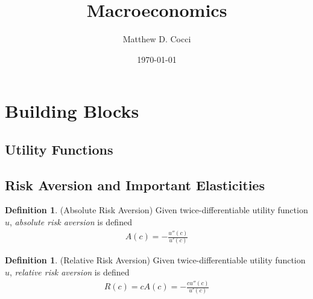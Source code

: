 \documentclass[12pt]{article}
\author{Matthew D. Cocci}
\title{Macroeconomics}
\date{\today}
\theoremstyle{plain}
\theoremstyle{definition}
\newtheorem{defn}[thm]{Definition}
\theoremstyle{remark}
\begin{document}
\maketitle

\tableofcontents

\clearpage

\section{Building Blocks}

\subsection{Utility Functions}


\subsection{Risk Aversion and Important Elasticities}

\begin{defn}(Absolute Risk Aversion)
Given twice-differentiable utility function $u$,
\emph{absolute risk aversion} is defined
\begin{align*}
  A(c) = -\frac{u''(c)}{u'(c)}
\end{align*}
\end{defn}

\begin{defn}(Relative Risk Aversion)
Given twice-differentiable utility function $u$,
\emph{relative risk aversion} is defined
\begin{align*}
  R(c) = cA(c) = -\frac{c u''(c)}{u'(c)}
\end{align*}
\end{defn}
\end{document}
